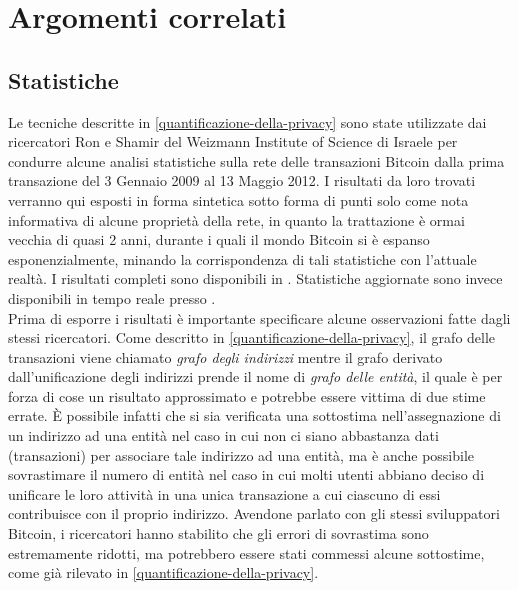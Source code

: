 \chapter{Argomenti correlati}

\section{Statistiche}

Le tecniche descritte in \ref{quantificazione-della-privacy} sono state utilizzate dai ricercatori Ron e Shamir del Weizmann Institute of Science di Israele per condurre alcune analisi statistiche sulla rete delle transazioni Bitcoin dalla prima transazione del 3 Gennaio 2009 al 13 Maggio 2012. I risultati da loro trovati verranno qui esposti in forma sintetica sotto forma di punti solo come nota informativa di alcune proprietà della rete, in quanto la trattazione è ormai vecchia di quasi 2 anni, durante i quali il mondo Bitcoin si è espanso esponenzialmente, minando la corrispondenza di tali statistiche con l'attuale realtà. I risultati completi sono disponibili in \cite{transazioni}. Statistiche aggiornate sono invece disponibili in tempo reale presso \cite{blockchain-info}.\\

Prima di esporre i risultati è importante specificare alcune osservazioni fatte dagli stessi ricercatori. Come descritto in \ref{quantificazione-della-privacy}, il grafo delle transazioni viene chiamato \emph{grafo degli indirizzi} mentre il grafo derivato dall'unificazione degli indirizzi prende il nome di \emph{grafo delle entità}, il quale è per forza di cose un risultato approssimato e potrebbe essere vittima di due stime errate. È possibile infatti che si sia verificata una sottostima nell'assegnazione di un indirizzo ad una entità nel caso in cui non ci siano abbastanza dati (transazioni) per associare tale indirizzo ad una entità, ma è anche possibile sovrastimare il numero di entità nel caso in cui molti utenti abbiano deciso di unificare le loro attività in una unica transazione a cui ciascuno di essi contribuisce con il proprio indirizzo. Avendone parlato con gli stessi sviluppatori Bitcoin, i ricercatori hanno stabilito che gli errori di sovrastima sono estremamente ridotti, ma potrebbero essere stati commessi alcune sottostime, come già rilevato in \ref{quantificazione-della-privacy}.\\

